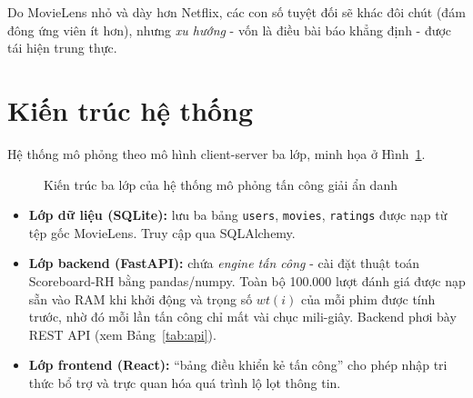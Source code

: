 Do MovieLens nhỏ và dày hơn Netflix, các con số tuyệt đối sẽ khác đôi chút (đám đông ứng viên ít hơn), nhưng \textit{xu hướng} - vốn là điều bài báo khẳng định - được tái hiện trung thực.

\section{Kiến trúc hệ thống}

Hệ thống mô phỏng theo mô hình client-server ba lớp, minh họa ở Hình~\ref{fig:arch}.

\begin{figure}[!htb]
\centering
{}
\caption{Kiến trúc ba lớp của hệ thống mô phỏng tấn công giải ẩn danh}
\label{fig:arch}
\end{figure}

\renewcommand{\labelitemi}{$-$}
\begin{itemize}
	\item \textbf{Lớp dữ liệu (SQLite):} lưu ba bảng \texttt{users}, \texttt{movies}, \texttt{ratings} được nạp từ tệp gốc MovieLens. Truy cập qua SQLAlchemy.
	\item \textbf{Lớp backend (FastAPI):} chứa \textit{engine tấn công} - cài đặt thuật toán Scoreboard-RH bằng pandas/numpy. Toàn bộ 100.000 lượt đánh giá được nạp sẵn vào RAM khi khởi động và trọng số $wt(i)$ của mỗi phim được tính trước, nhờ đó mỗi lần tấn công chỉ mất vài chục mili-giây. Backend phơi bày REST API (xem Bảng~\ref{tab:api}).
	\item \textbf{Lớp frontend (React):} ``bảng điều khiển kẻ tấn công'' cho phép nhập tri thức bổ trợ và trực quan hóa quá trình lộ lọt thông tin.
\end{itemize}

